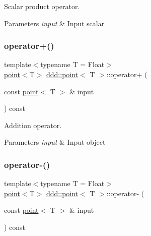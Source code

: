 Scalar product operator. 


\begin{DoxyParams}{Parameters}
{\em input} & Input scalar \\
\hline
\end{DoxyParams}
\mbox{\label{classddd_1_1point_ab0b0c990b117bb889d34d44509b645be}} 
\subsubsection{\texorpdfstring{operator+()}{operator+()}}
{\footnotesize\ttfamily template$<$typename T = Float$>$ \\
\hyperlink{classddd_1_1point}{point}$<$T$>$ \hyperlink{classddd_1_1point}{ddd\+::point}$<$ T $>$\+::operator+ (\begin{DoxyParamCaption}\item[{const \hyperlink{classddd_1_1point}{point}$<$ T $>$ \&}]{input }\end{DoxyParamCaption}) const\hspace{0.3cm}{\ttfamily [inline]}}



Addition operator. 


\begin{DoxyParams}{Parameters}
{\em input} & Input object \\
\hline
\end{DoxyParams}
\mbox{\label{classddd_1_1point_a5621f5a883c88d5588e09f9ff0de6575}} 
\subsubsection{\texorpdfstring{operator-\/()}{operator-()}}
{\footnotesize\ttfamily template$<$typename T = Float$>$ \\
\hyperlink{classddd_1_1point}{point}$<$T$>$ \hyperlink{classddd_1_1point}{ddd\+::point}$<$ T $>$\+::operator-\/ (\begin{DoxyParamCaption}\item[{const \hyperlink{classddd_1_1point}{point}$<$ T $>$ \&}]{input }\end{DoxyParamCaption}) const\hspace{0.3cm}{\ttfamily [inline]}}



